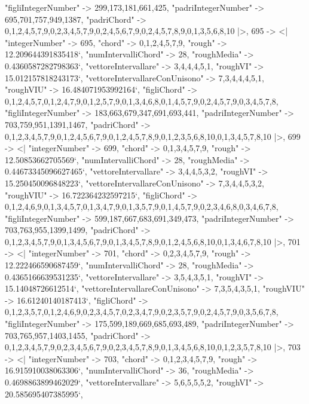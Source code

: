 \documentclass[
]{article}
\begin{document}
\begin{DatasetVerbatim}
    "figliIntegerNumber" -> {299,173,181,661,425},
    "padriIntegerNumber" -> {695,701,757,949,1387},
    "padriChord" -> {{0,1,2,4,5,7,9},{0,2,3,4,5,7,9},{0,2,4,5,6,7,9},{0,2,4,5,7,8,9},{0,1,3,5,6,8,10}}
  |>,
  695 -> <|
    "integerNumber" -> 695,
    "chord" -> {0,1,2,4,5,7,9},
    "rough" -> 12.209644391835418`,
    "numIntervalliChord" -> 28,
    "roughMedia" -> 0.4360587282798363`,
    "vettoreIntervallare" -> {3,4,4,4,5,1},
    "roughVI" -> 15.012157818243173`,
    "vettoreIntervallareConUnisono" -> {7,3,4,4,4,5,1},
    "roughVIU" -> 16.484071953992164`,
    "figliChord" -> {{0,1,2,4,5,7},{0,1,2,4,7,9},{0,1,2,5,7,9},{0,1,3,4,6,8},{0,1,4,5,7,9},{0,2,4,5,7,9},{0,3,4,5,7,8}},
    "figliIntegerNumber" -> {183,663,679,347,691,693,441},
    "padriIntegerNumber" -> {703,759,951,1391,1467},
    "padriChord" -> {{0,1,2,3,4,5,7,9},{0,1,2,4,5,6,7,9},{0,1,2,4,5,7,8,9},{0,1,2,3,5,6,8,10},{0,1,3,4,5,7,8,10}}
  |>,
  699 -> <|
    "integerNumber" -> 699,
    "chord" -> {0,1,3,4,5,7,9},
    "rough" -> 12.50853662705569`,
    "numIntervalliChord" -> 28,
    "roughMedia" -> 0.44673345096627465`,
    "vettoreIntervallare" -> {3,4,4,5,3,2},
    "roughVI" -> 15.250450096848223`,
    "vettoreIntervallareConUnisono" -> {7,3,4,4,5,3,2},
    "roughVIU" -> 16.722364232597215`,
    "figliChord" -> {{0,1,2,4,6,9},{0,1,3,4,5,7},{0,1,3,4,7,9},{0,1,3,5,7,9},{0,1,4,5,7,9},{0,2,3,4,6,8},{0,3,4,6,7,8}},
    "figliIntegerNumber" -> {599,187,667,683,691,349,473},
    "padriIntegerNumber" -> {703,763,955,1399,1499},
    "padriChord" -> {{0,1,2,3,4,5,7,9},{0,1,3,4,5,6,7,9},{0,1,3,4,5,7,8,9},{0,1,2,4,5,6,8,10},{0,1,3,4,6,7,8,10}}
  |>,
  701 -> <|
    "integerNumber" -> 701,
    "chord" -> {0,2,3,4,5,7,9},
    "rough" -> 12.222466590687459`,
    "numIntervalliChord" -> 28,
    "roughMedia" -> 0.4365166639531235`,
    "vettoreIntervallare" -> {3,5,4,3,5,1},
    "roughVI" -> 15.14048726612514`,
    "vettoreIntervallareConUnisono" -> {7,3,5,4,3,5,1},
    "roughVIU" -> 16.61240140187413`,
    "figliChord" -> {{0,1,2,3,5,7},{0,1,2,4,6,9},{0,2,3,4,5,7},{0,2,3,4,7,9},{0,2,3,5,7,9},{0,2,4,5,7,9},{0,3,5,6,7,8}},
    "figliIntegerNumber" -> {175,599,189,669,685,693,489},
    "padriIntegerNumber" -> {703,765,957,1403,1455},
    "padriChord" -> {{0,1,2,3,4,5,7,9},{0,2,3,4,5,6,7,9},{0,2,3,4,5,7,8,9},{0,1,3,4,5,6,8,10},{0,1,2,3,5,7,8,10}}
  |>,
  703 -> <|
    "integerNumber" -> 703,
    "chord" -> {0,1,2,3,4,5,7,9},
    "rough" -> 16.915910038063306`,
    "numIntervalliChord" -> 36,
    "roughMedia" -> 0.4698863899462029`,
    "vettoreIntervallare" -> {5,6,5,5,5,2},
    "roughVI" -> 20.585695407385995`,

\end{DatasetVerbatim}
\end{document}
